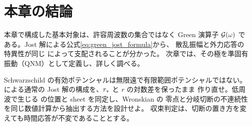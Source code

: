 \section{本章の結論}

本章で構成した基本対象は、許容周波数の集合ではなく Green 演算子
$\mathcal{G}(\omega)$ である。Jost 解による公式\eqref{eq:green_jost_formula}から、
散乱振幅と外力応答の特異性が同じ  によって支配されることが分かった。
次章では、その極を準固有振動（QNM）として定義し、詳しく調べる。

\begin{researchproblem}
Schwarzschild の有効ポテンシャルは無限遠で有限範囲ポテンシャルではない。
による通常の Jost 解の構成を、$r_*$ と $r$ の対数差を保ったまま
作り直せ。低周波で生じる  の位置と sheet を同定し、Wronskian の
零点と分岐切断の不連続性を同じ数値計算から抽出する方法を設計せよ。
収束判定は、切断の置き方を変えても時間応答が不変であることとする。
\end{researchproblem}
